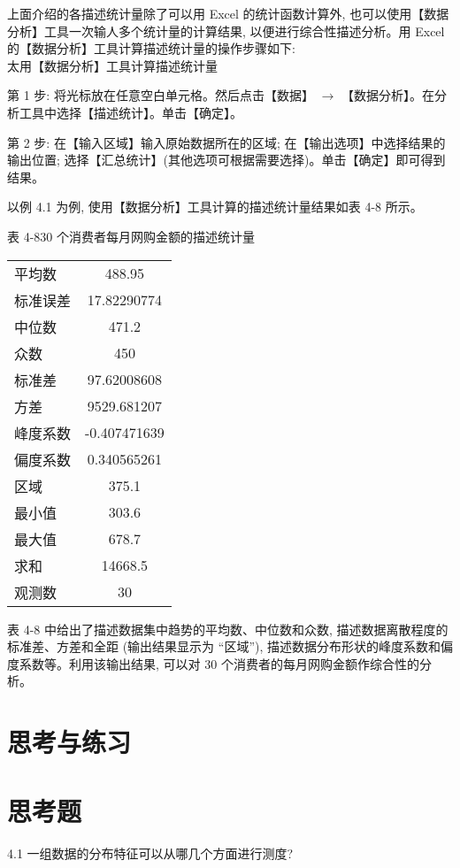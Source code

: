 \documentclass[10pt]{article}
\begin{document}
\begin{CJK*}{UTF8}{bsmi}
上面介绍的各描述统计量除了可以用 Excel 的统计函数计算外, 也可以使用【数据分析】工具一次输人多个统计量的计算结果, 以便进行综合性描述分析。用 Excel 的【数据分析】工具计算描述统计量的操作步骤如下:\\
太用【数据分析】工具计算描述统计量

第 1 步: 将光标放在任意空白单元格。然后点击【数据】 $\rightarrow$ 【数据分析】。在分析工具中选择【描述统计】。单击【确定】。

第 2 步: 在【输入区域】输入原始数据所在的区域; 在【输出选项】中选择结果的输出位置; 选择【汇总统计】(其他选项可根据需要选择)。单击【确定】即可得到结果。

以例 4.1 为例, 使用【数据分析】工具计算的描述统计量结果如表 4-8 所示。

表 4-830 个消费者每月网购金额的描述统计量

\begin{center}
\begin{tabular}{lc}
\hline
平均数 & 488.95 \\
标准误差 & 17.82290774 \\
中位数 & 471.2 \\
众数 & 450 \\
标准差 & 97.62008608 \\
方差 & 9529.681207 \\
峰度系数 & -0.407471639 \\
偏度系数 & 0.340565261 \\
区域 & 375.1 \\
最小值 & 303.6 \\
最大值 & 678.7 \\
求和 & 14668.5 \\
观测数 & 30 \\
\hline
\end{tabular}
\end{center}

表 4-8 中给出了描述数据集中趋势的平均数、中位数和众数, 描述数据离散程度的标准差、方差和全距 (输出结果显示为 “区域”), 描述数据分布形状的峰度系数和偏度系数等。利用该输出结果, 可以对 30 个消费者的每月网购金额作综合性的分析。

\section*{思考与练习}
\section*{思考题}
4.1 一组数据的分布特征可以从哪几个方面进行测度?


\end{CJK*}
\end{document}
